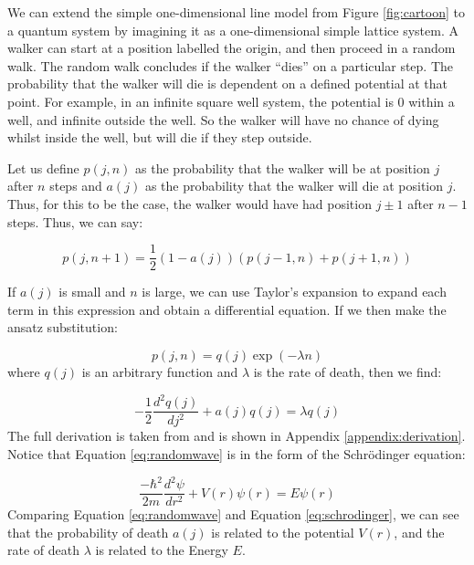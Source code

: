 \documentclass[journal]{IEEEtran}
\begin{document}
We can extend the simple one-dimensional line model from Figure
\ref{fig:cartoon} to a quantum system by imagining it as a one-dimensional
simple lattice system. A walker can start at a position labelled the origin, and
then proceed in a random walk. The random walk concludes if the walker ``dies''
on a particular step. The probability that the walker will die is dependent on a
defined potential at that point. For example, in an infinite square well system,
the potential is 0 within a well, and infinite outside the well. So the walker
will have no chance of dying whilst inside the well, but will die if they step
outside.

Let us define $p(j,n)$ as the probability that the walker will be at position
$j$ after $n$ steps and $a(j)$ as the probability that the walker will die at
position $j$. Thus, for this to be the case, the walker would have had position
$j\pm1$ after $n-1$ steps. Thus, we can say:

\begin{equation}
  p(j, n+1) =  \frac{1}{2}(1-a(j))(p(j-1,n) + p(j+1,n))
  \nonumber
\end{equation}

If $a(j)$ is small and $n$ is large, we can use Taylor's expansion to expand
each term in this expression and obtain a differential equation. If we then
make the ansatz substitution:

\begin{equation}
  p(j,n) = q(j) \exp(-\lambda n)
  \label{eq:firsteq}
\end{equation}
where $q(j)$ is an arbitrary function and $\lambda$ is the rate of death, then
we find:

\begin{equation}
  -\frac{1}{2} \frac{d^2q(j)}{dj^2} + a(j)q(j) = \lambda q(j)
  \label{eq:randomwave}
\end{equation}
The full derivation is taken from \cite{MarcusNewton2020} and is shown in
Appendix \ref{appendix:derivation}. Notice that Equation \ref{eq:randomwave} is
in the form of the Schr\"{o}dinger equation:

\begin{equation}
  \label{eq:schrodinger}
  \frac{-\hbar^2}{2m}\frac{d^2 \psi}{dr^2} + V(r)\psi(r) = E\psi(r)
\end{equation}
Comparing Equation \ref{eq:randomwave} and Equation \ref{eq:schrodinger}, we can
see that the probability of death $a(j)$ is related to the potential $V(r)$,
and the rate of death $\lambda$ is related to the Energy $E$.
\end{document}
